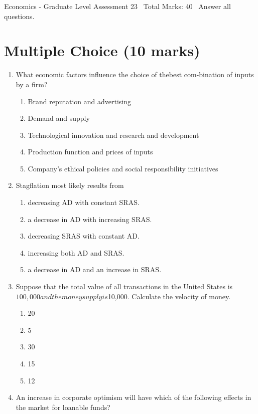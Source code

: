 \documentclass[12pt]{article}
\begin{document}
\begin{center}
Economics - Graduate Level Assessment 23 \
Total Marks: 40 \
Answer all questions.
\end{center}

\section*{Multiple Choice (10 marks)}
\begin{enumerate}[label=\arabic*.]
\item What economic factors influence the choice of thebest com-bination of inputs by a firm?
\begin{enumerate}[label=(\alph*)]
    \item Brand reputation and advertising
    \item Demand and supply
    \item Technological innovation and research and development
    \item Production function and prices of inputs
    \item Company's ethical policies and social responsibility initiatives
\end{enumerate}
\item Stagflation most likely results from
\begin{enumerate}[label=(\alph*)]
    \item decreasing AD with constant SRAS.
    \item a decrease in AD with increasing SRAS.
    \item decreasing SRAS with constant AD.
    \item increasing both AD and SRAS.
    \item a decrease in AD and an increase in SRAS.
\end{enumerate}
\item Suppose that the total value of all transactions in the United States is $100,000 and the money supply is $10,000. Calculate the velocity of money.
\begin{enumerate}[label=(\alph*)]
    \item 20
    \item 5
    \item 30
    \item 15
    \item 12
\end{enumerate}
\item An increase in corporate optimism will have which of the following effects in the market for loanable funds?

\end{enumerate}
\end{document}
